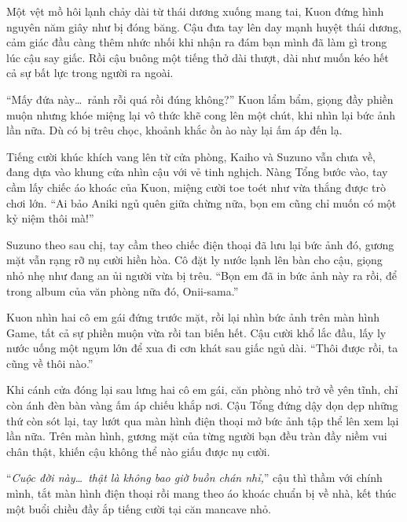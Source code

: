 \documentclass[../main.tex]{subfiles}
\begin{document}
Một vệt mồ hôi lạnh chảy dài từ thái dương xuống mang tai, Kuon đứng hình nguyên năm giây như bị đóng băng. Cậu đưa tay lên day mạnh huyệt thái dương, cảm giác đầu càng thêm nhức nhối khi nhận ra đám bạn mình đã làm gì trong lúc cậu say giấc. Rồi cậu buông một tiếng thở dài thượt, dài như muốn kéo hết cả sự bất lực trong người ra ngoài.

``Mấy đứa này\dots\ rảnh rỗi quá rồi đúng không?'' Kuon lẩm bẩm, giọng đầy phiền muộn nhưng khóe miệng lại vô thức khẽ cong lên một chút, khi nhìn lại bức ảnh lần nữa. Dù có bị trêu chọc, khoảnh khắc ồn ào này lại ấm áp đến lạ.

Tiếng cười khúc khích vang lên từ cửa phòng, Kaiho và Suzuno vẫn chưa về, đang dựa vào khung cửa nhìn cậu với vẻ tinh nghịch. Nàng Tổng bước vào, tay cầm lấy chiếc áo khoác của Kuon, miệng cười toe toét như vừa thắng được trò chơi lớn. ``Ai bảo Aniki ngủ quên giữa chừng nữa, bọn em cũng chỉ muốn có một kỷ niệm thôi mà!''

Suzuno theo sau chị, tay cầm theo chiếc điện thoại đã lưu lại bức ảnh đó, gương mặt vẫn rạng rỡ nụ cười hiền hòa. Cô đặt ly nước lạnh lên bàn cho cậu, giọng nhỏ nhẹ như đang an ủi người vừa bị trêu. ``Bọn em đã in bức ảnh này ra rồi, để trong album của văn phòng nữa đó, Onii-sama.''

Kuon nhìn hai cô em gái đứng trước mặt, rồi lại nhìn bức ảnh trên màn hình Game, tất cả sự phiền muộn vừa rồi tan biến hết. Cậu cười khổ lắc đầu, lấy ly nước uống một ngụm lớn để xua đi cơn khát sau giấc ngủ dài. ``Thôi được rồi, ta cũng về thôi nào.''

Khi cánh cửa đóng lại sau lưng hai cô em gái, căn phòng nhỏ trở về yên tĩnh, chỉ còn ánh đèn bàn vàng ấm áp chiếu khắp nơi. Cậu Tổng đứng dậy dọn dẹp những thứ còn sót lại, tay lướt qua màn hình điện thoại mở bức ảnh tập thể lên xem lại lần nữa. Trên màn hình, gương mặt của từng người bạn đều tràn đầy niềm vui chân thật, khiến cậu không thể nào giấu được nụ cười.

``\textit{Cuộc đời này\dots\ thật là không bao giờ buồn chán nhỉ,}'' cậu thì thầm với chính mình, tắt màn hình điện thoại rồi mang theo áo khoác chuẩn bị về nhà, kết thúc một buổi chiều đầy ắp tiếng cười tại căn mancave nhỏ.
\end{document}

